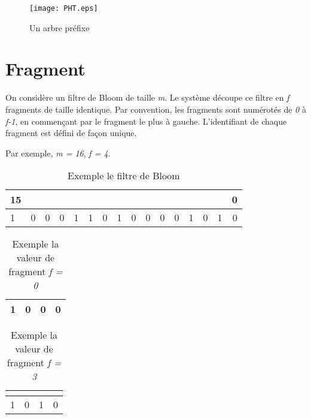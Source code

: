 \documentclass[a4paper,11pt]{report}
\begin{document}
	\begin{figure}[!htbp]
	\centering
	\texttt{[image: PHT.eps]}
	\caption{Un arbre préfixe}
\end{figure}	

\newpage

\section{Fragment}
	On considère un filtre de Bloom de taille \textit{m}. Le système découpe ce filtre en \textit{f} fragments de taille identique. Par convention, les fragments sont numérotés de \textit{0} à \textit{f-1}, en commençant par le fragment le plus à gauche. L'identifiant de chaque fragment est défini de façon unique.
	
		Par exemple, \textit{m = 16}, \textit{f = 4}.

	\begin{table}[!h]
		\centering		
		\begin{tabular}{|l|*{14}{c|}r|}
		\multicolumn{1}{c}{{\scriptsize 15}} &\multicolumn{1}{c}{}&\multicolumn{1}{c}{}&\multicolumn{1}{c|}{}&\multicolumn{1}{c}{}&\multicolumn{1}{c}{}&\multicolumn{1}{c}{}&\multicolumn{1}{c|}{}&\multicolumn{1}{c}{}&\multicolumn{1}{c}{}&\multicolumn{1}{c}{}&\multicolumn{1}{c|}{}&\multicolumn{1}{c}{}&\multicolumn{1}{c}{}&\multicolumn{1}{c}{}&\multicolumn{1}{c}{{\scriptsize 0}}\\
		\hline
			1 & 0 & 0 & 0 & 1 & 1 & 0 & 1 & 0 & 0 & 0 & 0 & 1 & 0 & 1 & 0 \\
		\hline
		\end{tabular}
		\caption{Exemple le filtre de Bloom}
		\label{fragment/filtredeBloom}
	\end{table}

	\begin{table}[!h]
		\centering		
		\begin{tabular}{|l|*{2}{c|}r|}
		\hline
			1 & 0 & 0 & 0 \\
		\hline
		\end{tabular}
		\caption{Exemple la valeur de fragment \textit{f = 0}}
		\label{fragement/exemple1}
	\end{table}

	\begin{table}[!h]
		\centering
		\begin{tabular}{|l|c|c|r|}
		\multicolumn{1}{c}{}&\multicolumn{1}{c}{}&\multicolumn{1}{c}{}\\
		\hline
			1 & 0 & 1 & 0 \\
		\hline
		\end{tabular}
		\caption{Exemple la valeur de fragment \textit{f = 3}}
		\label{fragement/exemple2}
	\end{table}
	
\end{document}
